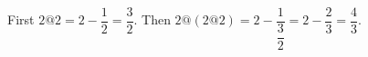First $2@2=2-\dfrac{1}{2}=\dfrac{3}{2}$. Then $2@(2@2)=2-\dfrac{1}{\dfrac{3}{2}}=2-\dfrac{2}{3}=\boxed{\dfrac{4}{3}}$.
